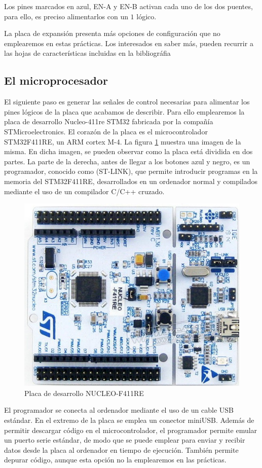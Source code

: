 \documentclass[10pt,a4paper]{report}
\begin{document}
Los pines marcados en azul, EN-A y EN-B activan cada uno de los dos puentes, para ello, es preciso alimentarlos con un $1$ lógico. 

La placa de expansión presenta más opciones de configuración que no emplearemos en estas prácticas. Los interesados en saber más, pueden recurrir a las hojas de características incluidas en la bibliográfia

  
\subsection{El microprocesador} \label{sec_mic}
El siguiente paso es generar las señales de control necesarias para alimentar  los pines lógicos de la placa que acabamos de describir. Para ello emplearemos la placa de desarrollo  Nucleo-411re STM32 fabricada por la compañía STMicroelectronics. El corazón de la placa es el microcontrolador STM32F411RE, un ARM cortex M-4.   
La  figura \ref{f11} muestra una imagen de  la misma. En dicha imagen, se pueden observar como la placa está dividida en dos partes. La parte de la derecha, antes de llegar a los botones azul y negro, es un programador, conocido como (ST-LINK), que permite introducir programas en la memoria del STM32F411RE, desarrollados en un ordenador normal y compilados mediante el uso de un compilador C/C++ cruzado. 
\begin{figure}
\centering
\includegraphics[scale=1.5,angle=180]{NUCLEO-F411RE.jpg}
\caption{Placa de desarrollo NUCLEO-F411RE }\label{f11}
\end{figure}
El programador se conecta al ordenador mediante el uso de un cable USB estándar. En el extremo de la placa se emplea un conector miniUSB. Además de permitir descargar código en el microcontrolador, el programador permite emular un puerto serie estándar, de modo que se puede emplear para enviar y recibir datos desde la placa al ordenador en tiempo de ejecución. También permite depurar código, aunque esta opción no la emplearemos en las prácticas. 
\end{document}
